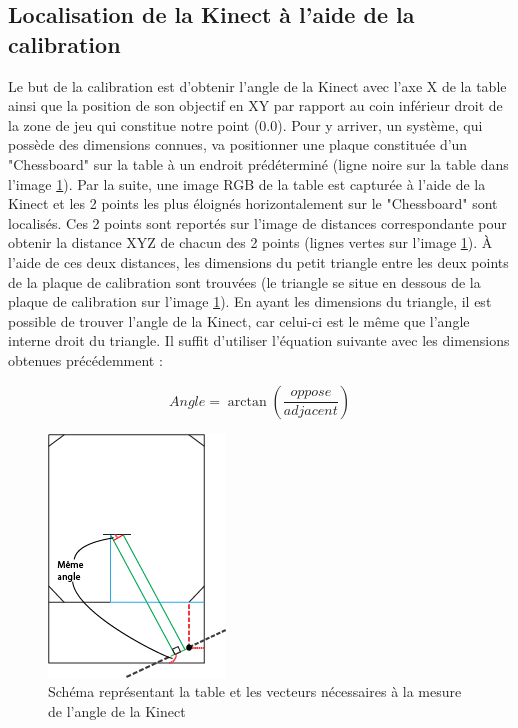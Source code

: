 \subsection{Localisation de la Kinect à l'aide de la calibration}
\label{s:kinectLocal}
Le but de la calibration est d'obtenir l'angle de la Kinect avec l'axe X de la table ainsi que la position de son objectif en XY par rapport au coin inférieur droit de la zone de jeu qui constitue notre point (0.0). Pour y arriver, un système, qui possède des dimensions connues, va positionner une plaque constituée d'un "Chessboard" sur la table à un endroit prédéterminé (ligne noire sur la table dans l'image \ref{fig:kinect_calibration}). Par la suite, une image RGB de la table est capturée à l'aide de la Kinect et les 2 points les plus éloignés horizontalement sur le "Chessboard" sont localisés. Ces 2 points sont reportés sur l'image de distances correspondante pour obtenir la distance XYZ de chacun des 2 points (lignes vertes sur l'image \ref{fig:kinect_calibration}). À l'aide de ces deux distances, les dimensions du petit triangle entre les deux points de la plaque de calibration sont trouvées (le triangle se situe en dessous de la plaque de calibration sur l'image \ref{fig:kinect_calibration}). En ayant les dimensions du triangle, il est possible de trouver l'angle de la Kinect, car celui-ci est le même que l'angle interne droit du triangle. Il suffit d'utiliser l'équation suivante avec les dimensions obtenues précédemment :

\begin{equation}
		Angle = \arctan \left( \frac{oppose}{adjacent} \right)
\end{equation}

\begin{figure}[htbp]
\centering
\includegraphics[scale=1]{fig/kinect_calibration.png}
\caption{Schéma représentant la table et les vecteurs nécessaires à la mesure de l'angle de la Kinect}
\label{fig:kinect_calibration}
\end{figure}

